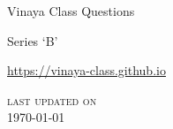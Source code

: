 \frontmatter

{\centering%

{\LARGE Vinaya Class Questions}

{\Large Series `B'}

\href{https://vinaya-class.github.io}{https://vinaya-class.github.io}

{\scshape\small last updated on}\\
\today

}

\tableofcontents*

\mainmatter








% 
% 
% 
% 
% 
% 
% 
% 
% 
% 
% 
% 
% 
% 
% 
% 
% 
% 
% 

